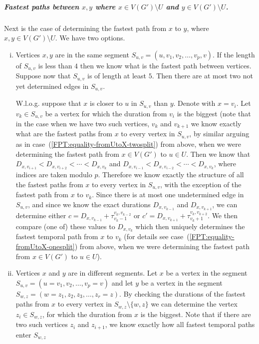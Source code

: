 \documentclass[a4paper,UKenglish,cleveref, autoref, thm-restate, anonymous]{lipics-v2021}
\begin{document}
\subparagraph{\boldmath Fastest paths between $x,y$ where $x \in V(G') \setminus U$ and $y \in V(G') \setminus U$.}
Next is the case of determining the fastest path from $x$ to $y$, where $x,y \in V(G') \setminus U$.
We have two options.
\begin{enumerate}[(i)]
    \item Vertices $x,y$ are in the same segment $S_{u,v} = (u,v_1,v_2, \dots, v_p, v)$. 
    If the length of $S_{u,v}$ is less than $4$ then we know what is the fastest path between vertices.
    Suppose now that $S_{u,v}$ is of length at least $5$. Then there are at most two not yet determined edges in $S_{u,v}$.
    
    W.l.o.g. suppose that $x$ is closer to $u$ in $S_{u,v}$ than $y$.
    Denote with $x = v_i$.
    Let $v_k \in S_{u,v}$ be a vertex for which the duration from $v_i$ is the biggest 
    (note that in the case when we have two such vertices, $v_k$ and $v_{k+1}$ we know exactly what are the fastest paths from $x$ to every vertex in $S_{u,v}$,
    by similar arguing as in case~(\ref{FPT:equality-fromUtoX-twosplit}) from above, when we were determining the fastest path from $x \in V(G')$ to $u \in U$.
    Then we know that $D_{x,v_{i+1}} < D_{x,v_{i+2}} < \cdots  < D_{x,v_{k}}$ and $D_{x,v_{i-1}} < D_{x,v_{i-2}} < \cdots  < D_{x,v_{k}}$, where indices are taken modulo $p$.
    Therefore we know exactly the structure of all the fastest paths from $x$ to every vertex in $S_{u,v}$,
    with the exception of the fastest path from $x$ to $v_k$.
    Since there is at most one undetermined edge in $S_{u,v}$,
    and since we know the exact durations $D_{x,v_{k-1}}$ and $D_{x,v_{k+1}}$,
    we can determine either
    $c = D_{x,v_{k-1}} + \tau _ {v_k-1}^{v_k,v_{k-2}}$ or 
    $c' = D_{x,v_{k+1}} + \tau _ {v_k+1}^{v_k,v_{k+2}}$.
    We then compare (one of) these values to $D_{x,v_k}$ which then 
    uniquely determines the fastest temporal path from $x$ to $v_k$
    (for details see case~(\ref{FPT:equality-fromUtoX-onesplit}) from above, when we were determining the fastest path from $x \in V(G')$ to $u \in U$).
    \item Vertices $x$ and $y$ are in different segments. 
Let $x$ be a vertex in the segment $S_{u,v} = (u=v_1,v_2, \dots, v_p = v)$ and let $y$ be a vertex in the segment $S_{w,z} = (w=z_1, z_2,z_3, \dots, z_r = z)$.
By checking the durations of the fastest paths from $x$ to every vertex in $S_{w,z} \setminus \{w,z\}$
we can determine the vertex $z_i \in S_{w,z} $, for which the duration from $x$ is the biggest.
Note that if there are two such vertices $z_i$ and $z_{i+1}$, we know exactly how all fastest temporal paths enter $S_{w,z}$ 

\end{enumerate}
\end{document}
